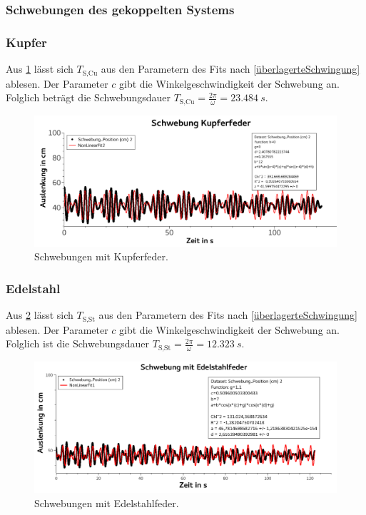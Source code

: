 \documentclass[
	a4paper,
	12pt,
	pagesize,
	ngerman
]{scrartcl}
\begin{document}
	\subsubsection{Schwebungen des gekoppelten Systems}

	\subsubsection*{Kupfer}
	Aus \cref{KupferSchwebung} lässt sich $T_\text{S,Cu}$ aus den Parametern des Fits nach \cref{überlagerteSchwingung} ablesen. Der Parameter $c$ gibt die Winkelgeschwindigkeit der Schwebung an. Folglich beträgt die Schwebungsdauer $T_\text{S,Cu} = \frac{2\pi}{\omega} = \SI{23,484}{s}$.
	\begin{figure}[H]
		\includegraphics[width=1\textwidth]{KupferSchwebung}
		\centering
		\caption{Schwebungen mit Kupferfeder.}
		\label{KupferSchwebung}
		\centering
	\end{figure}

	\subsubsection*{Edelstahl}
	Aus \cref{EdelstahlSchwebung} lässt sich $T_\text{S,St}$ aus den Parametern des Fits nach \cref{überlagerteSchwingung} ablesen. Der Parameter $c$ gibt die Winkelgeschwindigkeit der Schwebung an. Folglich ist die Schwebungsdauer $T_\text{S,St} = \frac{2\pi}{\omega} = \SI{12,323}{s}$.
	\begin{figure}[H]
		\includegraphics[width=1\textwidth]{EdelstahlSchwebung}
		\centering
		\caption{Schwebungen mit Edelstahlfeder.}
		\label{EdelstahlSchwebung}
		\centering
	\end{figure}
\end{document}
